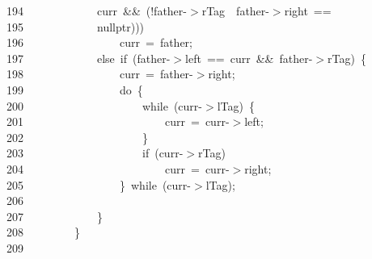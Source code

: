 \documentclass[11pt,a4paper]{ctexart}
\newcommand{\hlstd}[1]{\textcolor[rgb]{0.2,0.2,0.2}{#1}}
\newcommand{\hlopt}[1]{\textcolor[rgb]{0.2,0.2,0.2}{#1}}
\newcommand{\hllin}[1]{\textcolor[rgb]{0.59,0.59,0.59}{#1}}
\newcommand{\hlkwa}[1]{\textcolor[rgb]{0.23,0.42,0.78}{#1}}
\newcommand{\hlkwc}[1]{\textcolor[rgb]{0,0.63,0.31}{#1}}
\begin{document}
\hllin{194\ }\hlstd{}\hlstd{\ \ \ \ \ \ \ \ \ \ \ \ }\hlstd{curr\ }\hlopt{\&\&\ (!}\hlstd{father}\hlopt{{-}$>$}\hlstd{rTag\ }\hlopt{\textbar \textbar \ }\hlstd{father}\hlopt{{-}$>$}\hlstd{right\ }\hlopt{==\ }\Righttorque\\
\hllin{195\ }\hlstd{}\hlstd{\ \ \ \ \ \ \ \ \ \ \ \ }\hlstd{}\hlkwc{nullptr}\hlstd{}\hlopt{)))}\\
\hllin{196\ }\hlstd{}\hlstd{\ \ \ \ \ \ \ \ \ \ \ \ \ \ \ \ }\hlstd{curr\ }\hlopt{=\ }\hlstd{father}\hlopt{;}\\
\hllin{197\ }\hlstd{}\hlstd{\ \ \ \ \ \ \ \ \ \ \ \ }\hlstd{}\hlkwa{else\ if\ }\hlstd{}\hlopt{(}\hlstd{father}\hlopt{{-}$>$}\hlstd{left\ }\hlopt{==\ }\hlstd{curr\ }\hlopt{\&\&\ }\hlstd{father}\hlopt{{-}$>$}\hlstd{rTag}\hlopt{)\ \{}\\
\hllin{198\ }\hlstd{}\hlstd{\ \ \ \ \ \ \ \ \ \ \ \ \ \ \ \ }\hlstd{curr\ }\hlopt{=\ }\hlstd{father}\hlopt{{-}$>$}\hlstd{right}\hlopt{;}\\
\hllin{199\ }\hlstd{}\hlstd{\ \ \ \ \ \ \ \ \ \ \ \ \ \ \ \ }\hlstd{}\hlkwa{do\ }\hlstd{}\hlopt{\{}\\
\hllin{200\ }\hlstd{}\hlstd{\ \ \ \ \ \ \ \ \ \ \ \ \ \ \ \ \ \ \ \ }\hlstd{}\hlkwa{while\ }\hlstd{}\hlopt{(}\hlstd{curr}\hlopt{{-}$>$}\hlstd{lTag}\hlopt{)\ \{}\\
\hllin{201\ }\hlstd{}\hlstd{\ \ \ \ \ \ \ \ \ \ \ \ \ \ \ \ \ \ \ \ \ \ \ \ }\hlstd{curr\ }\hlopt{=\ }\hlstd{curr}\hlopt{{-}$>$}\hlstd{left}\hlopt{;}\\
\hllin{202\ }\hlstd{}\hlstd{\ \ \ \ \ \ \ \ \ \ \ \ \ \ \ \ \ \ \ \ }\hlstd{}\hlopt{\}}\\
\hllin{203\ }\hlstd{}\hlstd{\ \ \ \ \ \ \ \ \ \ \ \ \ \ \ \ \ \ \ \ }\hlstd{}\hlkwa{if\ }\hlstd{}\hlopt{(}\hlstd{curr}\hlopt{{-}$>$}\hlstd{rTag}\hlopt{)}\\
\hllin{204\ }\hlstd{}\hlstd{\ \ \ \ \ \ \ \ \ \ \ \ \ \ \ \ \ \ \ \ \ \ \ \ }\hlstd{curr\ }\hlopt{=\ }\hlstd{curr}\hlopt{{-}$>$}\hlstd{right}\hlopt{;}\\
\hllin{205\ }\hlstd{}\hlstd{\ \ \ \ \ \ \ \ \ \ \ \ \ \ \ \ }\hlstd{}\hlopt{\}\ }\hlstd{}\hlkwa{while\ }\hlstd{}\hlopt{(}\hlstd{curr}\hlopt{{-}$>$}\hlstd{lTag}\hlopt{);}\\
\hllin{206\ }\hlstd{}\\
\hllin{207\ }\hlstd{}\hlstd{\ \ \ \ \ \ \ \ \ \ \ \ }\hlstd{}\hlopt{\}}\\
\hllin{208\ }\hlstd{}\hlstd{\ \ \ \ \ \ \ \ }\hlstd{}\hlopt{\}}\\
\hllin{209\ }\hlstd{}\\
\end{document}
